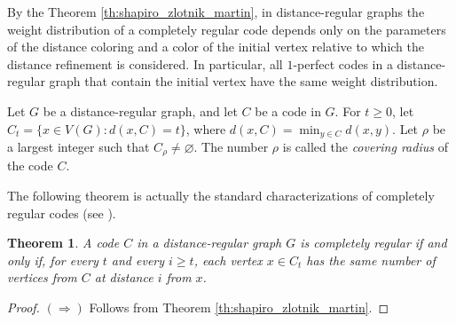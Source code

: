 \documentclass[11pt]{article}
\newtheorem{theorem}{Theorem}[section]
\theoremstyle{definition}
\begin{document}
{{{By the Theorem \ref{th:shapiro_zlotnik_martin}, in distance-regular graphs  the weight distribution of a completely regular
code depends only on the parameters of the distance coloring  and a color of the initial vertex relative to which the distance refinement  is considered. In particular, all $1$-perfect codes in a
distance-regular graph that
contain the initial vertex have the same weight distribution.

Let $G$ be a distance-regular graph, and let $C$ be a code in $G$.
For $t\geq 0$, let  $C_t=\{x\in V(G) : d(x,C)=t\}$, where $d(x,C)=\min_{y\in C}d(x,y)$. Let $\rho$ be a largest integer such that  $C_\rho \neq \varnothing$. The number $\rho$ is called the {\sl covering radius} of the code $C$.

The following theorem is actually the standard characterizations of completely regular codes (see \cite{BCN}).


\begin{theorem}\label{thcritDRG}
A code $C$ in a distance-regular graph $G$ is completely
regular if and only if, for every $t$ and every $i\geq t$,
each vertex $x\in C_t$ has the same number
of vertices from $C$  at distance $i$ from $x$.
\end{theorem}
\begin{proof}
$(\Rightarrow)$ Follows from Theorem \ref{th:shapiro_zlotnik_martin}.


\end{proof}}}}
\end{document}
